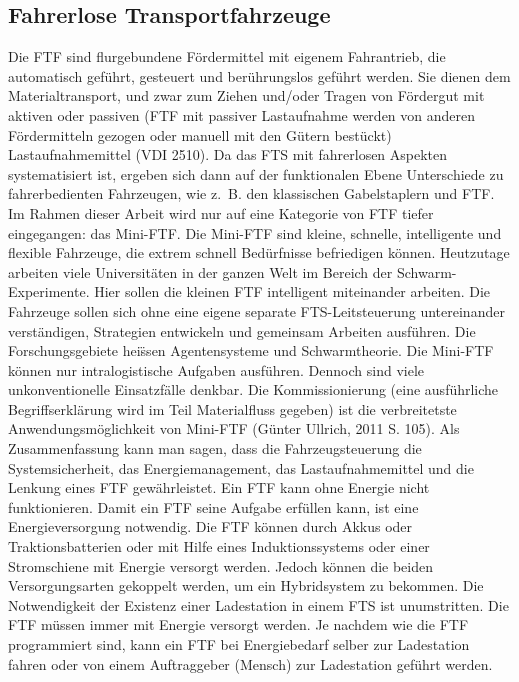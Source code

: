 \subsection{Fahrerlose Transportfahrzeuge}
Die FTF sind flurgebundene F\"ordermittel mit eigenem Fahrantrieb, die automatisch gef\"uhrt, gesteuert und ber\"uhrungslos gef\"uhrt werden. Sie dienen dem Materialtransport, und zwar zum Ziehen und/oder Tragen von F\"ordergut mit aktiven oder passiven (FTF mit passiver Lastaufnahme werden von anderen F\"ordermitteln gezogen oder manuell mit den G\"utern best\"uckt) Lastaufnahmemittel (VDI 2510). Da das FTS mit fahrerlosen Aspekten systematisiert ist, ergeben sich dann auf der funktionalen Ebene Unterschiede zu fahrerbedienten Fahrzeugen, wie z.~B. den klassischen Gabelstaplern und FTF. Im Rahmen dieser Arbeit wird nur auf eine Kategorie von FTF tiefer eingegangen: das Mini-FTF. Die Mini-FTF sind kleine, schnelle, intelligente und flexible Fahrzeuge, die extrem schnell Bed\"urfnisse befriedigen k\"onnen. Heutzutage arbeiten viele Universit\"aten in der ganzen Welt im Bereich der Schwarm-Experimente. Hier sollen die kleinen FTF intelligent miteinander arbeiten. Die Fahrzeuge sollen sich ohne eine eigene separate FTS-Leitsteuerung untereinander verst\"andigen, Strategien entwickeln und gemeinsam Arbeiten ausf\"uhren. Die Forschungsgebiete hei\"ssen Agentensysteme und Schwarmtheorie. Die Mini-FTF k\"onnen nur intralogistische Aufgaben ausf\"uhren. Dennoch sind viele unkonventionelle Einsatzf\"alle denkbar. Die Kommissionierung (eine ausf\"uhrliche Begriffserkl\"arung wird im Teil Materialfluss gegeben) ist die verbreitetste Anwendungsm\"oglichkeit von Mini-FTF (G\"unter Ullrich, 2011 S. 105).
Als Zusammenfassung kann man sagen, dass die Fahrzeugsteuerung die Systemsicherheit, das Energiemanagement, das Lastaufnahmemittel und die Lenkung eines FTF gew\"ahrleistet. Ein FTF kann ohne Energie nicht funktionieren. Damit ein FTF seine Aufgabe erf\"ullen kann, ist eine Energieversorgung notwendig. Die FTF können durch Akkus oder Traktionsbatterien oder mit Hilfe eines Induktionssystems oder einer Stromschiene mit Energie versorgt werden. Jedoch k\"onnen die beiden Versorgungsarten gekoppelt werden, um ein Hybridsystem zu bekommen. Die Notwendigkeit der Existenz einer Ladestation in einem FTS ist unumstritten. Die FTF m\"ussen immer mit Energie versorgt werden. Je nachdem wie die FTF programmiert sind, kann ein FTF bei Energiebedarf selber zur Ladestation fahren oder von einem Auftraggeber (Mensch) zur Ladestation gef\"uhrt werden.

